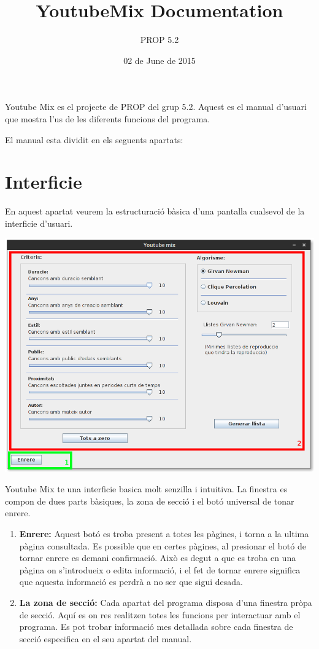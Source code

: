 \documentclass[a4paper,10pt,oneside]{sphinxmanual}
\title{YoutubeMix Documentation}
\date{02 de June de 2015}
\author{PROP 5.2}
\begin{document}
\maketitle
\tableofcontents
{}\label{index::doc}


Youtube Mix es el projecte de PROP del grup 5.2. Aquest es el manual d'usuari que mostra l'us de les diferents funcions del programa.

El manual esta dividit en els seguents apartats:


\chapter{Interficie}
\label{interficie:interficie}\label{interficie::doc}\label{interficie:manual-d-usuari-de-youtube-mix}
En aquest apartat veurem la estructuració bàsica d'una pantalla cualsevol de la interficie d'usuari.

\includegraphics{interficie.png}

Youtube Mix te una interficie basica molt senzilla i intuitiva.
La finestra es compon de dues parts bàsiques, la zona de secció i el botó universal de tonar enrere.
\begin{enumerate}
\item {} 
\textbf{Enrere:} Aquest botó es troba present a totes les pàgines, i torna a la ultima pàgina consultada. Es possible que en certes pàgines, al presionar el botó de tornar enrere es demani confirmació. Això es degut a que es troba en una pàgina on s'introdueix o edita informació, i el fet de tornar enrere significa que aquesta informació es perdrà a no ser que sigui desada.

\item {} 
\textbf{La zona de secció:} Cada apartat del programa disposa d'una finestra pròpa de secció. Aquí es on res realitzen totes les funcions per interactuar amb el programa. Es pot trobar informació mes detallada sobre cada finestra de secció especifica en el seu apartat del manual.

\end{enumerate}
\end{document}

